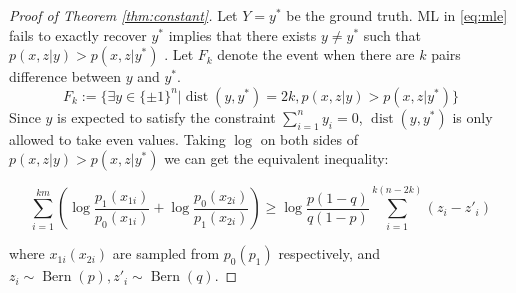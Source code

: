 \documentclass[conference]{IEEEtran}
\DeclareMathOperator{\dist}{dist}
\DeclareMathOperator{\Bern}{Bern}
\begin{document}
\begin{proof}[Proof of Theorem \ref{thm:constant}]
Let $Y=y^*$ be the ground truth.
ML in \eqref{eq:mle} fails to exactly recover $y^*$ implies that there exists $y\neq y^*$ such that $p(x,z|y) > p(x,z|y^*)$	. Let $F_k$ denote
the event when there are $k$ pairs difference between $y$ and $y^*$.
\begin{equation}\label{eq:Fk}
F_k:=\{\exists y \in \{\pm 1\}^n | \dist(y, y^*)=2k, p(x,z|y) > p(x,z|y^*) \}
\end{equation}
Since
$y$ is expected to satisfy the constraint $\sum_{i=1}^n y_i=0$, $\dist(y, y^*)$ is only allowed to take even
values. Taking $\log$ on both sides of $p(x,z|y) > p(x,z|y^*)$ we can get the equivalent inequality:

\begin{equation}\label{eq:ein}
\sum_{i=1}^{km} (\log \frac{p_1(x_{1i})}{p_0(x_{1i})}
+ \log \frac{p_0(x_{2i})}{p_1(x_{2i})})
\geq \log \frac{p(1-q)}{q(1-p)} \sum_{i=1}^{k(n-2k)}(z_{i} - z'_{i})
\end{equation}

where $x_{1i}(x_{2i})$ are sampled from $p_0(p_1)$ respectively,
and $z_{i} \sim \Bern(p), z'_{i} \sim \Bern(q)$.


\end{proof}
\end{document}
